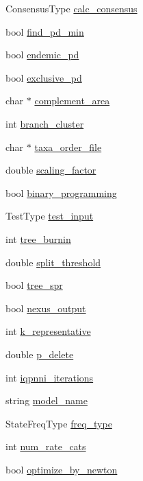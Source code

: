 \begin{DoxyCompactItemize}
\item 
ConsensusType \hyperlink{structParams_a5ec9506c1542fcae316153229fb4c9be}{calc\_\-consensus}
\item 
bool \hyperlink{structParams_a021b7ee8df12237dae17cd4572f5f4db}{find\_\-pd\_\-min}
\item 
bool \hyperlink{structParams_a122ecf2200489cc4464df2dac76c0128}{endemic\_\-pd}
\item 
bool \hyperlink{structParams_aa62226e3872e1c56ffdd034c19555789}{exclusive\_\-pd}
\item 
char $\ast$ \hyperlink{structParams_a1386d8afdf2ff06b85f3a0be5ddfa823}{complement\_\-area}
\item 
int \hyperlink{structParams_a5ca0c7f44245eca4522cfcf82fb5490a}{branch\_\-cluster}
\item 
char $\ast$ \hyperlink{structParams_ad15ab64e7e9b8686c789aee676c19ac9}{taxa\_\-order\_\-file}
\item 
double \hyperlink{structParams_a34fce45414ecb0b1629ed858f02df0be}{scaling\_\-factor}
\item 
bool \hyperlink{structParams_a9386717dfd35f6fa4ecde965aadef2cb}{binary\_\-programming}
\item 
TestType \hyperlink{structParams_aa079ee14272d9032681bb814d21fb6db}{test\_\-input}
\item 
int \hyperlink{structParams_a74d04b254a9213c18dd3119331795ef5}{tree\_\-burnin}
\item 
double \hyperlink{structParams_a8e5d88154702dd77ae3acc1244b6b0ac}{split\_\-threshold}
\item 
bool \hyperlink{structParams_a9123fc947c3d4707fa39debd109e70f1}{tree\_\-spr}
\item 
bool \hyperlink{structParams_a91030c2a58bbf5c53f91c2d14dcae7c1}{nexus\_\-output}
\item 
int \hyperlink{structParams_ae0f41285759c8d6b4f059a1c3bd9b8ca}{k\_\-representative}
\item 
double \hyperlink{structParams_a5f2181d954439ef8c43fb9f6dd07139b}{p\_\-delete}
\item 
int \hyperlink{structParams_abe6f69e000e06dcc8aec92f8301b1f63}{iqpnni\_\-iterations}
\item 
string \hyperlink{structParams_a3f8a82796a96decaefc07154b58565cf}{model\_\-name}
\item 
StateFreqType \hyperlink{structParams_aa7578d1989c15917667f77c5def68e88}{freq\_\-type}
\item 
int \hyperlink{structParams_aa3139383f4a928160f768f084fa09771}{num\_\-rate\_\-cats}
\item 
bool \hyperlink{structParams_acd0efde7ff44948e3193e1e248866e8b}{optimize\_\-by\_\-newton}
\end{DoxyCompactItemize}


